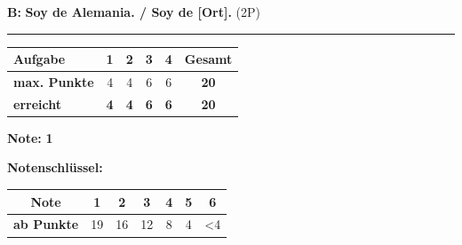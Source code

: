 \documentclass[11pt, a4paper]{article}
\newcommand{\lsg}[1]{\textcolor{loesung}{\textbf{#1}}}
\begin{document}
\noindent
\textbf{B:} \lsg{Soy de Alemania. / Soy de [Ort].} \hfill (2P)

\vspace{25pt}
\hrule
\vspace{10pt}

\noindent
\begin{tabularx}{\textwidth}{|X|c|c|c|c||c|}
\hline
\textbf{Aufgabe} & 1 & 2 & 3 & 4 & \textbf{Gesamt} \\
\hline
\textbf{max. Punkte} & 4 & 4 & 6 & 6 & \textbf{20} \\
\hline
\textbf{erreicht} & \lsg{4} & \lsg{4} & \lsg{6} & \lsg{6} & \lsg{20} \\
\hline
\end{tabularx}

\vspace{10pt}

\begin{flushright}
\textbf{Note:} \lsg{1}
\end{flushright}

\vspace{1em}

\textbf{Notenschlüssel:}

\begin{tabular}{|c|c|c|c|c|c|c|}
\hline
\textbf{Note} & 1 & 2 & 3 & 4 & 5 & 6 \\
\hline
\textbf{ab Punkte} & 19 & 16 & 12 & 8 & 4 & <4 \\
\hline
\end{tabular}
\end{document}
